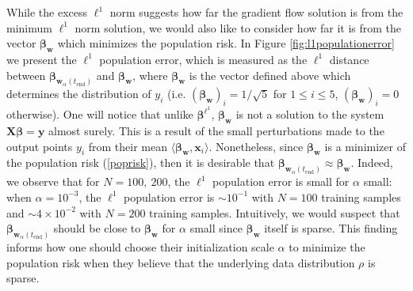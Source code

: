 \documentclass{article}
\begin{document}
While the excess $\ell^1$ norm suggests how far the gradient flow solution is from the minimum $\ell^1$ norm solution, we would also like to consider how far it is from the vector $\boldsymbol{\beta}_{\boldsymbol{w}}$ which minimizes the population risk. In Figure \ref{fig:l1populationerror} we present the $\ell^1$ population error, which is measured as the $\ell^1$ distance between $\boldsymbol{\beta}_{\boldsymbol{w}_{\alpha}(t_{\text{end}})}$ and $\boldsymbol{\beta}_{\boldsymbol{w}}$, where $\boldsymbol{\beta}_{\boldsymbol{w}}$ is the vector defined above which determines the distribution of $y_i$ (i.e. $(\boldsymbol{\beta}_{\boldsymbol{w}})_i = 1/\sqrt{5}$ for $1 \leq i \leq 5$, $(\boldsymbol{\beta}_{\boldsymbol{w}})_i = 0$ otherwise). One will notice that unlike $\boldsymbol{\beta}^{\ell^1}$, $\boldsymbol{\beta}_{\boldsymbol{w}}$ is not a solution to the system $\boldsymbol{X} \boldsymbol{\beta} = \boldsymbol{y}$ almost surely. This is a result of the small perturbations made to the output points $y_i$ from their mean $\langle \boldsymbol{\beta}_{\boldsymbol{w}}, \boldsymbol{x}_i \rangle$. Nonetheless, since $\boldsymbol{\beta}_{\boldsymbol{w}}$ is a minimizer of the population risk (\ref{poprisk}), then it is desirable that $\boldsymbol{\beta}_{\boldsymbol{w}_{\alpha}(t_{\text{end}})} \approx \boldsymbol{\beta}_{\boldsymbol{w}}$. Indeed, we observe that for $N = 100, \ 200$, the $\ell^1$ population error is small for $\alpha$ small: when $\alpha = 10^{-3}$, the $\ell^1$ population error is $\sim 10^{-1}$ with $N=100$ training samples and $\sim 4 \times 10^{-2}$ with $N=200$ training samples. Intuitively, we would suspect that  $\boldsymbol{\beta}_{\boldsymbol{w}_{\alpha}(t_{\text{end}})}$ should be close to $\boldsymbol{\beta}_{\boldsymbol{w}}$ for $\alpha$ small since $\boldsymbol{\beta}_{\boldsymbol{w}}$ itself is sparse. This finding informs how one should choose their initialization scale $\alpha$ to minimize the population risk when they believe that the underlying data distribution $\rho$ is sparse.
\end{document}
